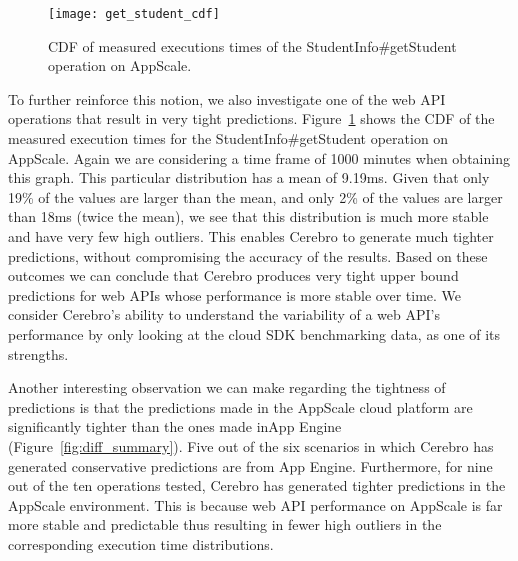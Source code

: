 \begin{figure}
\centering
\texttt{[image: get\_student\_cdf]}
\caption{CDF of measured executions times of the StudentInfo\#getStudent operation on AppScale.}
\label{fig:get_student_cdf}
\end{figure}

To further reinforce this notion, we also investigate one of the web API operations that result in very tight predictions. 
Figure~\ref{fig:get_student_cdf} shows the CDF of the measured execution times for the StudentInfo\#getStudent operation on
AppScale. Again we are considering a time frame of 1000 minutes when obtaining this graph.
This particular distribution has a mean of 9.19ms. Given that only 19\% of the values are larger than the mean, 
and only 2\% of the values are larger than 18ms (twice the mean), 
we see that this distribution is much more stable and have very few high outliers. This enables Cerebro to generate much
tighter predictions, without compromising the accuracy of the results. Based on these outcomes we can conclude that Cerebro produces
very tight upper bound predictions for web APIs whose performance is more stable over time. %
We consider Cerebro's ability to understand the variability of a web API's performance by only looking at the cloud SDK
benchmarking data, as one of its strengths.

Another interesting observation we can make regarding the tightness of predictions is that 
the predictions made in the AppScale cloud platform are significantly tighter than the ones made inApp Engine (Figure~\ref{fig:diff_summary}). 
Five out of the six scenarios in which Cerebro has generated conservative predictions are from App Engine. Furthermore,
for nine out of the ten operations tested, Cerebro has generated tighter predictions in the AppScale environment. This is 
because web API performance on AppScale is far more stable and predictable thus resulting in fewer high outliers in the corresponding
execution time distributions.

